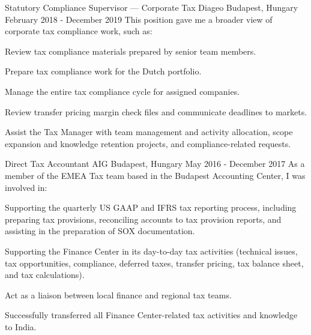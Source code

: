 \begin{cventries}

  \cventry
    {Statutory Compliance Supervisor — Corporate Tax} %
    {Diageo} %
    {Budapest, Hungary} %
    {February 2018 - December 2019} %
    {This position gave me a broader view of corporate tax compliance work, such as:} %
    {
      \begin{cvitems} %
        \item {Review tax compliance materials prepared by senior team members.}
        \item {Prepare tax compliance work for the Dutch portfolio.}
        \item {Manage the entire tax compliance cycle for assigned companies.}
        \item {Review transfer pricing margin check files and communicate deadlines to markets.}
        \item {Assist the Tax Manager with team management and activity allocation, scope expansion and knowledge retention projects, and compliance-related requests.}
      \end{cvitems}
    }


  \cventry
    {Direct Tax Accountant} %
    {AIG} %
    {Budapest, Hungary} %
    {May 2016 - December 2017} %
    {As a member of the EMEA Tax team based in the Budapest Accounting Center, I was involved in:} %
    {
      \begin{cvitems} %
        \item {Supporting the quarterly US GAAP and IFRS tax reporting process, including preparing tax provisions, reconciling accounts to tax provision reports, and assisting in the preparation of SOX documentation.}
        \item {Supporting the Finance Center in its day-to-day tax activities (technical issues, tax opportunities, compliance, deferred taxes, transfer pricing, tax balance sheet, and tax calculations).}
        \item {Act as a liaison between local finance and regional tax teams.}
        \item {Successfully transferred all Finance Center-related tax activities and knowledge to India.}
      \end{cvitems}
    }


\end{cventries}
